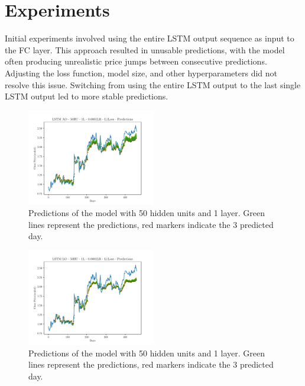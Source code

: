 \section{Experiments}

Initial experiments involved using the entire LSTM output sequence as input to the FC layer. This approach resulted in unusable predictions, with the model often producing unrealistic price jumps between consecutive predictions. Adjusting the loss function, model size, and other hyperparameters did not resolve this issue. Switching from using the entire LSTM output to the last single LSTM output led to more stable predictions. 

\begin{figure}[h]
    \centering
    \includegraphics[width=0.5\textwidth, trim=20 0 20 10, clip]{plots/LSTM AO - 50HU - 1L - 0.0001LR - L1Loss-predictions.pdf}
    \caption{Predictions of the model with 50 hidden units and 1 layer. Green lines represent the predictions, red markers indicate the 3 predicted day.}
    \label{fig:ao_50HU_1L}
\end{figure}

\begin{figure}[h]
    \centering
    \includegraphics[width=0.5\textwidth, trim=20 0 20 10, clip]{plots/LSTM LO - 50HU - 1L - 0.0001LR - L1Loss-predictions.pdf}
    \caption{Predictions of the model with 50 hidden units and 1 layer. Green lines represent the predictions, red markers indicate the 3 predicted day.}
    \label{fig:lo_50HU_1L}
\end{figure}


